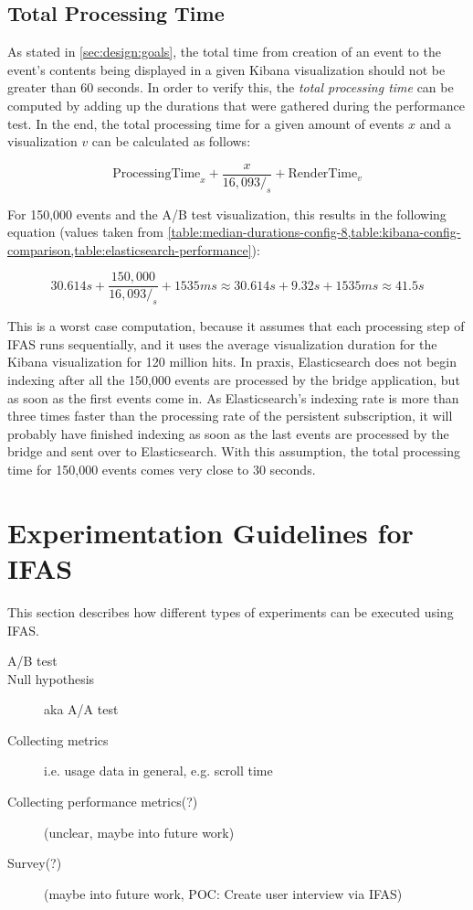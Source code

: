 \subsection{Total Processing Time}
\label{subsec:evaluation:performance:total-processing-time}

As stated in \cref{sec:design:goals}, the total time from creation of an event to the event's contents being displayed in a given Kibana visualization should not be greater than 60 seconds.
In order to verify this, the \emph{total processing time} can be computed by adding up the durations that were gathered during the performance test.
In the end, the total processing time for a given amount of events $x$ and a visualization $v$ can be calculated as follows:

$$ \text{ProcessingTime}_x + \frac{x}{16,093/_s} + \text{RenderTime}_v$$

For 150,000 events and the A/B test visualization, this results in the following equation (values taken from \cref{table:median-durations-config-8,table:kibana-config-comparison,table:elasticsearch-performance}):

$$ 30.614s + \frac{150,000}{16,093/_s} + 1535ms \approx 30.614s + 9.32s + 1535ms \approx 41.5s $$

This is a worst case computation, because it assumes that each processing step of \ac{IFAS} runs sequentially, and it uses the average visualization duration for the Kibana visualization for 120 million hits.
In praxis, Elasticsearch does not begin indexing after all the 150,000 events are processed by the bridge application, but as soon as the first events come in.
As Elasticsearch's indexing rate is more than three times faster than the processing rate of the persistent subscription, it will probably have finished indexing as soon as the last events are processed by the bridge and sent over to Elasticsearch.
With this assumption, the total processing time for 150,000 events comes very close to 30 seconds.

\section{Experimentation Guidelines for IFAS}

This section describes how different types of experiments can be executed using \ac{IFAS}.

\begin{description}
\item[A/B test]
\item[Null hypothesis] aka A/A test \cite{Kohavi2009}
\item[Collecting metrics] i.e. usage data in general, e.g. scroll time
\item[Collecting performance metrics(?)] (unclear, maybe into future work)
\item[Survey(?)] (maybe into future work, POC: Create user interview via \ac{IFAS})
\end{description}

